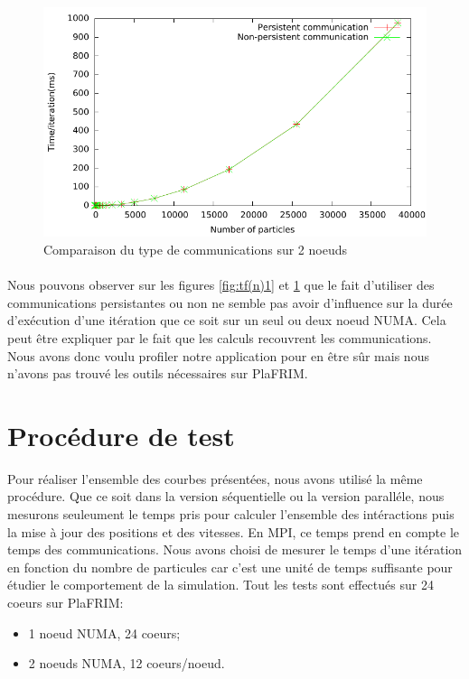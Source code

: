 \documentclass{article}
\begin{document}
\begin{figure}[h]
  \centering
  \includegraphics[scale=0.7]{ResultTDP2/mpi_comm/mpi_comm_multinode.pdf}
  \caption{\label{fig:tf(n)2}Comparaison du type de communications sur 2 noeuds}
\end{figure}


\paragraph{}
Nous pouvons observer sur les figures \ref{fig:tf(n)1} et \ref{fig:tf(n)2} que le fait d'utiliser des communications persistantes ou non ne semble pas avoir d'influence sur la durée d'exécution d'une itération que ce soit sur un seul ou deux noeud NUMA. Cela peut être expliquer par le fait que les calculs recouvrent les communications. Nous avons donc voulu profiler notre application pour en être sûr mais nous n'avons pas trouvé les outils nécessaires sur PlaFRIM.




\section{Procédure de test}
Pour réaliser l'ensemble des courbes présentées, nous avons utilisé la même procédure. Que ce soit dans la version séquentielle ou la version paralléle, nous mesurons seuleument le temps pris pour calculer l'ensemble des intéractions puis la mise à jour des positions et des vitesses. En MPI, ce temps prend en compte le temps des communications. Nous avons choisi de mesurer le temps d'une itération en fonction du nombre de particules car c'est une unité de temps suffisante pour étudier le comportement de la simulation. Tout les tests sont effectués sur 24 coeurs sur PlaFRIM: 
\begin{itemize}
\item 1 noeud NUMA, 24 coeurs;
\item 2 noeuds NUMA, 12 coeurs/noeud.
\end{itemize}
\end{document}
